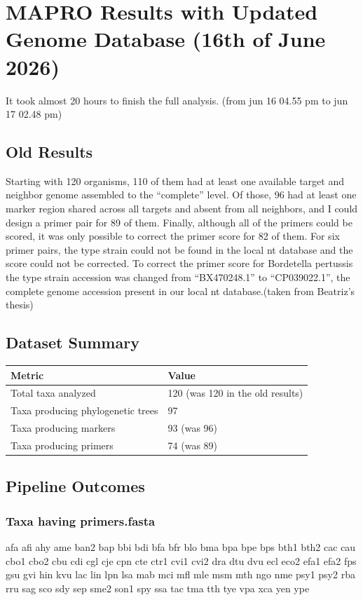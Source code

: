 \documentclass[11pt]{article}
\author{Elif Güler}
\date{\today}
\title{}
\begin{document}
\tableofcontents

\section{MAPRO Results with Updated Genome Database (16th of June 2026)}
\label{sec:org6ca04d6}
It took almost 20 hours to finish the full analysis.
(from jun 16 04.55 pm to jun 17 02.48 pm)
\subsection{Old Results}
\label{sec:org691a93f}
Starting with 120 organisms, 110 of them had at least one available target and neighbor
genome assembled to the “complete” level. Of those, 96 had at least one marker region
shared across all targets and absent from all neighbors, and I could design a primer pair
for 89 of them. Finally, although all of the primers could be scored, it was only possible to
correct the primer score for 82 of them. For six primer pairs, the type strain could not be
found in the local nt database and the score could not be corrected. To correct the primer
score for Bordetella pertussis the type strain accession was changed from “BX470248.1”
to “CP039022.1”, the complete genome accession present in our local nt database.(taken from
Beatriz's thesis)
\subsection{Dataset Summary}
\label{sec:org5e2b0ba}

\begin{center}
\begin{tabular}{ll}
Metric & Value\\
\hline
Total taxa analyzed & 120 (was 120 in the old results)\\
Taxa producing phylogenetic trees & 97\\
Taxa producing markers & 93 (was 96)\\
Taxa producing primers & 74 (was 89)\\
\end{tabular}
\end{center}
\subsection{Pipeline Outcomes}
\label{sec:org06a409b}

\subsubsection{Taxa having primers.fasta}
\label{sec:org8afb7e6}
afa afi
ahy ame
ban2 bap
bbi bdi
bfa bfr
blo bma
bpa bpe
bps bth1
bth2 cac
cau cbo1
cbo2 cbu
cdi cgl
cje cpn
cte ctr1
cvi1 cvi2
dra dtu
dvu ecl
eco2 efa1
efa2 fps
gsu gvi
hin kvu
lac lin
lpn lsa
mab mci
mfl mle
msm mth
ngo nme
psy1 psy2
rba rru
sag sco
sdy sep
sme2 son1
spy ssa
tac tma
tth tye
vpa xca
yen ype
\end{document}
